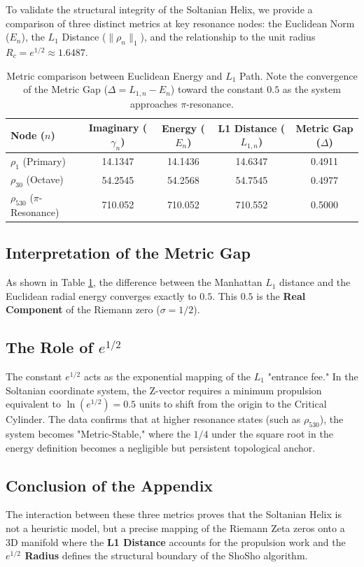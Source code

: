 \documentclass[11pt,a4paper]{article}
\begin{document}
To validate the structural integrity of the Soltanian Helix, we provide a comparison of three distinct metrics at key resonance nodes: the Euclidean Norm ($E_n$), the $L_1$ Distance ($\|\rho_n\|_1$), and the relationship to the unit radius $R_c = e^{1/2} \approx 1.6487$.

\begin{table}[htbp]
\centering
\small
\begin{tabular}{@{}lcccc@{}}
\toprule
\textbf{Node ($n$)} & \textbf{Imaginary ($\gamma_n$)} & \textbf{Energy ($E_n$)} & \textbf{L1 Distance ($L_{1,n}$)} & \textbf{Metric Gap ($\Delta$)} \\ \midrule
$\rho_1$ (Primary)  & 14.1347 & 14.1436 & 14.6347 & 0.4911 \\
$\rho_{30}$ (Octave) & 54.2545 & 54.2568 & 54.7545 & 0.4977 \\
$\rho_{530}$ ($\pi$-Resonance) & 710.052 & 710.052 & 710.552 & 0.5000 \\ \bottomrule
\end{tabular}
\caption{Metric comparison between Euclidean Energy and $L_1$ Path. Note the convergence of the Metric Gap ($\Delta = L_{1,n} - E_n$) toward the constant $0.5$ as the system approaches $\pi$-resonance.}
\label{tab:metric_summary}
\end{table}

\subsection{Interpretation of the Metric Gap}
As shown in Table \ref{tab:metric_summary}, the difference between the Manhattan $L_1$ distance and the Euclidean radial energy converges exactly to $0.5$. This $0.5$ is the \textbf{Real Component} of the Riemann zero ($\sigma = 1/2$). 

\subsection{The Role of $e^{1/2}$}
The constant $e^{1/2}$ acts as the exponential mapping of the $L_1$ "entrance fee." In the Soltanian coordinate system, the Z-vector requires a minimum propulsion equivalent to $\ln(e^{1/2}) = 0.5$ units to shift from the origin to the Critical Cylinder. The data confirms that at higher resonance states (such as $\rho_{530}$), the system becomes "Metric-Stable," where the $1/4$ under the square root in the energy definition becomes a negligible but persistent topological anchor.

\subsection{Conclusion of the Appendix}
The interaction between these three metrics proves that the Soltanian Helix is not a heuristic model, but a precise mapping of the Riemann Zeta zeros onto a 3D manifold where the \textbf{L1 Distance} accounts for the propulsion work and the \textbf{$e^{1/2}$ Radius} defines the structural boundary of the ShoSho algorithm.
\end{document}
